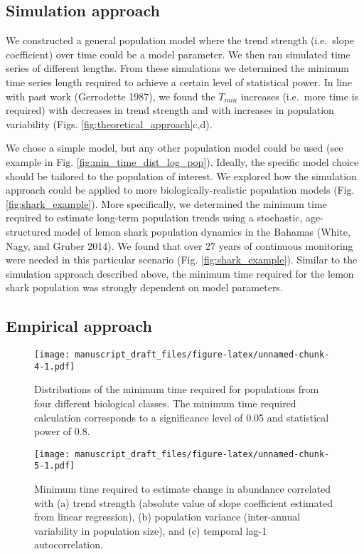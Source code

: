 \documentclass[12pt,]{article}
\begin{document}
\subsection{Simulation approach}\label{simulation-approach-1}

We constructed a general population model where the trend strength
(i.e.~slope coefficient) over time could be a model parameter. We then
ran simulated time series of different lengths. From these simulations
we determined the minimum time series length required to achieve a
certain level of statistical power. In line with past work (Gerrodette
1987), we found the \(T_{min}\) increases (i.e.~more time is required)
with decreases in trend strength and with increases in population
variability (Figs. \ref{fig:theoretical_approach}c,d).

We chose a simple model, but any other population model could be used
(see example in Fig. \ref{fig:min_time_dist_log_pop}). Ideally, the
specific model choice should be tailored to the population of interest.
We explored how the simulation approach could be applied to more
biologically-realistic population models (Fig. \ref{fig:shark_example}).
More specifically, we determined the minimum time required to estimate
long-term population trends using a stochastic, age-structured model of
lemon shark population dynamics in the Bahamas (White, Nagy, and Gruber
2014). We found that over 27 years of continuous monitoring were needed
in this particular scenario (Fig. \ref{fig:shark_example}). Similar to
the simulation approach described above, the minimum time required for
the lemon shark population was strongly dependent on model parameters.

\subsection{Empirical approach}\label{empirical-approach-1}

\begin{figure}[htbp]
\centering
\texttt{[image: manuscript\_draft\_files/figure-latex/unnamed-chunk-4-1.pdf]}
\caption{Distributions of the minimum time required for populations from
four different biological classes. The minimum time required calculation
corresponds to a significance level of 0.05 and statistical power of
0.8.\label{fig:min_time_dist}}
\end{figure}

\begin{figure}[htbp]
\centering
\texttt{[image: manuscript\_draft\_files/figure-latex/unnamed-chunk-5-1.pdf]}
\caption{Minimum time required to estimate change in abundance
correlated with (a) trend strength (absolute value of slope coefficient
estimated from linear regression), (b) population variance (inter-annual
variability in population size), and (c) temporal lag-1
autocorrelation.\label{fig:correlates}}
\end{figure}
\end{document}
